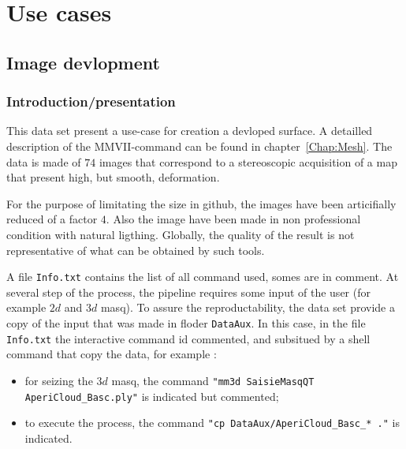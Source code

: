 

\chapter{Use cases}


\section{Image devlopment}


\subsection{Introduction/presentation}

This data set present a use-case for creation a devloped surface.  A detailled
description of the MMVII-command can be found in chapter~\ref{Chap:Mesh}.
The data  is made of $74$ images that correspond to a stereoscopic
acquisition of a map that present high, but smooth, deformation.

For the purpose of limitating the size in github, the images have been articifially
reduced of a factor $4$. Also the image have been made in non professional
condition with natural ligthing. Globally, the quality of the result is
not representative of what can be obtained by such tools.

A file {\tt Info.txt} contains the list of all command used, somes are in
comment.
At several step of the process, the pipeline requires some input of the user
(for example $2d$ and $3d$ masq).  To assure the reproductability, the 
data set provide a copy of the input that was made in floder {\tt DataAux}. 
In this case, in the file {\tt Info.txt}  the interactive command id commented, and subsitued
by a shell command that copy the data, for example :

\begin{itemize}
    \item for seizing the $3d$ masq, the command {\tt"mm3d SaisieMasqQT AperiCloud\_Basc.ply"}
	    is indicated but commented;
    \item to execute the process, the command {\tt "cp DataAux/AperiCloud\_Basc\_* ."} is indicated.
\end{itemize}

